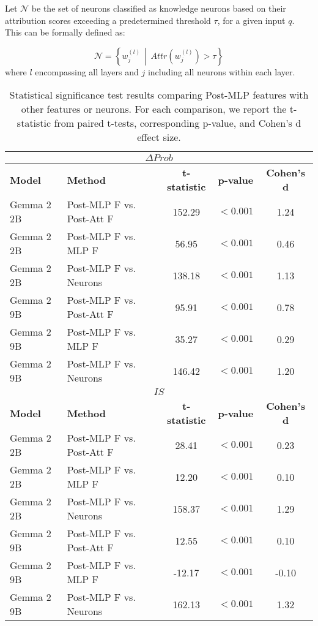 Let \( \mathcal{N} \) be the set of neurons classified as knowledge neurons based on their attribution scores exceeding a predetermined threshold \( \tau \), for a given input \( q \). This can be formally defined as:

\begin{equation}
\mathcal{N} = \left\{ w_j^{(l)} \,\middle|\, Attr(w_j^{(l)}) > \tau \right\}
\end{equation}where \(l\) encompassing all layers and \(j\) including all neurons within each layer.

\begin{table*}[h]
\centering
\begin{tabular}{llccc}
\toprule
\multicolumn{5}{c}{\textbf{$\Delta Prob$}} \\
\toprule
\textbf{Model} & \textbf{Method} & \textbf{t-statistic} & \textbf{p-value} & \textbf{Cohen's d} \\
\midrule
Gemma 2 2B & Post-MLP F vs. Post-Att F & 152.29 & $<0.001$ & 1.24 \\
Gemma 2 2B & Post-MLP F vs. MLP F & 56.95 & $<0.001$ & 0.46 \\
Gemma 2 2B & Post-MLP F vs. Neurons & 138.18 & $<0.001$ & 1.13 \\
\midrule
Gemma 2 9B & Post-MLP F vs. Post-Att F & 95.91 & $<0.001$ & 0.78 \\
Gemma 2 9B & Post-MLP F vs. MLP F & 35.27 & $<0.001$ & 0.29 \\
Gemma 2 9B & Post-MLP F vs. Neurons & 146.42 & $<0.001$ & 1.20 \\
\bottomrule
\toprule
\multicolumn{5}{c}{\textbf{$IS$}} \\
\toprule
\textbf{Model} & \textbf{Method} & \textbf{t-statistic} & \textbf{p-value} & \textbf{Cohen's d} \\
\midrule
Gemma 2 2B & Post-MLP F vs. Post-Att F & 28.41 & $<0.001$ & 0.23 \\
Gemma 2 2B & Post-MLP F vs. MLP F & 12.20 & $<0.001$ & 0.10 \\
Gemma 2 2B & Post-MLP F vs. Neurons & 158.37 & $<0.001$ & 1.29 \\
\midrule
Gemma 2 9B & Post-MLP F vs. Post-Att F & 12.55 & $<0.001$ & 0.10 \\
Gemma 2 9B & Post-MLP F vs. MLP F & -12.17 & $<0.001$ & -0.10 \\
Gemma 2 9B & Post-MLP F vs. Neurons & 162.13 & $<0.001$ & 1.32 \\
\bottomrule
\end{tabular}
\caption{Statistical significance test results comparing Post-MLP features with other features or neurons. For each comparison, we report the t-statistic from paired t-tests, corresponding p-value, and Cohen's d effect size.}
\label{appendix:table:statistical_tests:main}
\end{table*}


